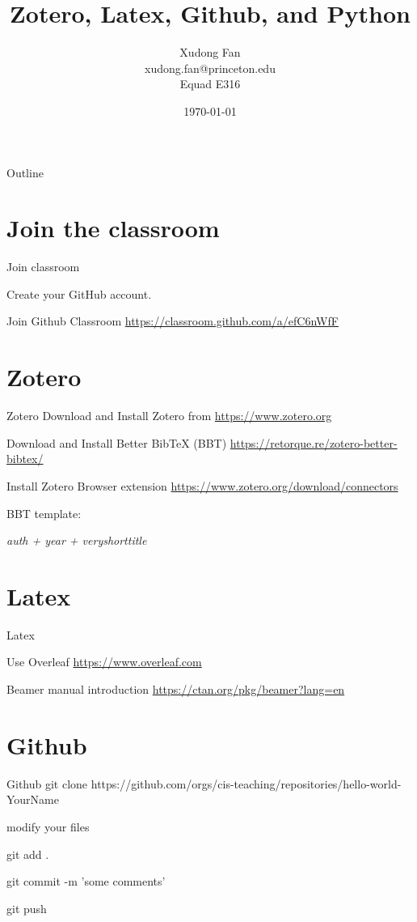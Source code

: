 \documentclass{beamer}
\title{Zotero, Latex, Github, and Python}
\author{Xudong Fan \\ xudong.fan@princeton.edu \\ Equad E316}
\date{\today}
\begin{document}
\begin{frame}
    \titlepage
\end{frame}

\logo{}


\begin{frame}{Outline}
    \tableofcontents
\end{frame}

\section{Join the classroom}
\begin{frame}{Join classroom}

    Create your GitHub account.

    Join Github Classroom \url{https://classroom.github.com/a/efC6nWfF}

\end{frame}

\section{Zotero}
\begin{frame}{Zotero}
    Download and Install Zotero from \url{https://www.zotero.org}

    Download and Install Better BibTeX (BBT) \url{https://retorque.re/zotero-better-bibtex/}

    Install Zotero Browser extension \url{https://www.zotero.org/download/connectors}

    BBT template:

    \em{auth + year + veryshorttitle}

\end{frame}

\section{Latex}
\begin{frame}{Latex}

    Use Overleaf \url{https://www.overleaf.com}

    Beamer manual introduction \url{https://ctan.org/pkg/beamer?lang=en}

\end{frame}

\section{Github}
\begin{frame}{Github}
    git clone {https://github.com/orgs/cis-teaching/repositories/hello-world-YourName}

    modify your files

    git add .

    git commit -m 'some comments'

    git push
\end{frame}
\end{document}

